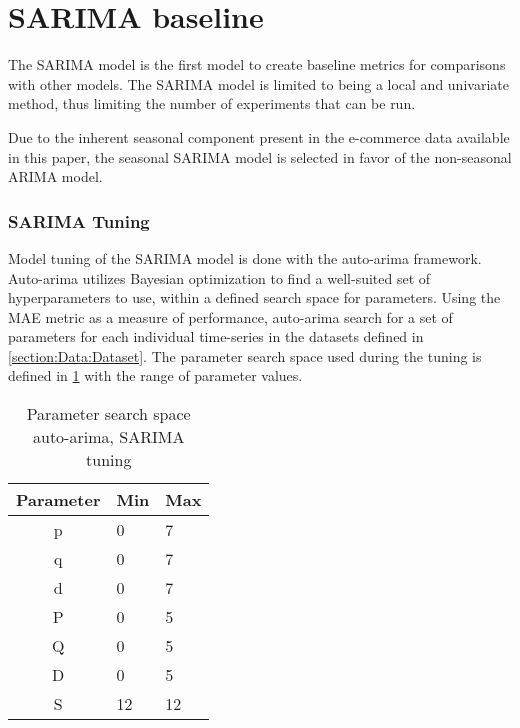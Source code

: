 
\section{SARIMA baseline}
\label{section:Method:SARIMA}

The SARIMA model is the first model to create baseline metrics for comparisons with other models.
The SARIMA model is limited to being a local and univariate method,
thus limiting the number of experiments that can be run.

Due to the inherent seasonal component present in the e-commerce data available in this paper,
the seasonal SARIMA model is selected in favor of the non-seasonal ARIMA model.

\subsubsection{SARIMA Tuning}
Model tuning of the SARIMA model is done with the auto-arima framework.
Auto-arima utilizes Bayesian optimization to find a well-suited set of hyperparameters to use,
within a defined search space for parameters.
Using the MAE metric as a measure of performance, auto-arima search for a set of parameters for each individual time-series
in the datasets defined in \cref{section:Data:Dataset}.
The parameter search space used during the tuning is defined in \cref{table:method:arima-tuning} with the range of parameter values.

\begin{table}[h]
  \centering
  \caption{Parameter search space auto-arima, SARIMA tuning}
  \label{table:method:arima-tuning}
  \begin{tabular}{|c|l|l|}\hline
    Parameter & Min & Max \\ \hline
    p         & 0   & 7   \\ \hline
    q         & 0   & 7   \\ \hline
    d         & 0   & 7   \\ \hline
    P         & 0   & 5   \\ \hline
    Q         & 0   & 5   \\ \hline
    D         & 0   & 5   \\ \hline
    S         & 12   & 12   \\ \hline
  \end{tabular}
\end{table}









